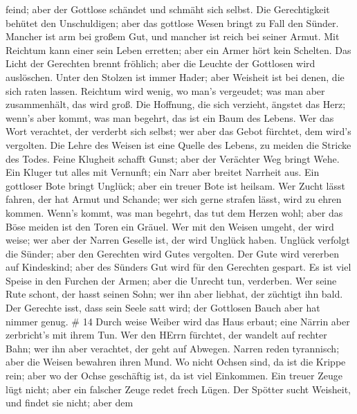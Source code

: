 feind; aber der Gottlose schändet und schmäht sich selbst. 
Die Gerechtigkeit behütet den Unschuldigen; aber das gottlose Wesen
bringt zu Fall den Sünder.  Mancher ist arm bei großem Gut,
und mancher ist reich bei seiner Armut.  Mit Reichtum kann
einer sein Leben erretten; aber ein Armer hört kein Schelten.
 Das Licht der Gerechten brennt fröhlich; aber die Leuchte
der Gottlosen wird auslöschen.  Unter den Stolzen ist immer
Hader; aber Weisheit ist bei denen, die sich raten lassen. 
Reichtum wird wenig, wo man's vergeudet; was man aber zusammenhält, das
wird groß.  Die Hoffnung, die sich verzieht, ängstet das
Herz; wenn's aber kommt, was man begehrt, das ist ein Baum des Lebens.
 Wer das Wort verachtet, der verderbt sich selbst; wer aber
das Gebot fürchtet, dem wird's vergolten.  Die Lehre des
Weisen ist eine Quelle des Lebens, zu meiden die Stricke des Todes.
 Feine Klugheit schafft Gunst; aber der Verächter Weg
bringt Wehe.  Ein Kluger tut alles mit Vernunft; ein Narr
aber breitet Narrheit aus.  Ein gottloser Bote bringt
Unglück; aber ein treuer Bote ist heilsam.  Wer Zucht lässt
fahren, der hat Armut und Schande; wer sich gerne strafen lässt, wird zu
ehren kommen.  Wenn's kommt, was man begehrt, das tut dem
Herzen wohl; aber das Böse meiden ist den Toren ein Gräuel.
 Wer mit den Weisen umgeht, der wird weise; wer aber der
Narren Geselle ist, der wird Unglück haben.  Unglück
verfolgt die Sünder; aber den Gerechten wird Gutes vergolten.
 Der Gute wird vererben auf Kindeskind; aber des Sünders
Gut wird für den Gerechten gespart.  Es ist viel Speise in
den Furchen der Armen; aber die Unrecht tun, verderben. 
Wer seine Rute schont, der hasst seinen Sohn; wer ihn aber liebhat, der
züchtigt ihn bald.  Der Gerechte isst, dass sein Seele satt
wird; der Gottlosen Bauch aber hat nimmer genug. \# 14 
Durch weise Weiber wird das Haus erbaut; eine Närrin aber zerbricht's
mit ihrem Tun.  Wer den HErrn fürchtet, der wandelt auf
rechter Bahn; wer ihn aber verachtet, der geht auf Abwegen. 
Narren reden tyrannisch; aber die Weisen bewahren ihren Mund.
 Wo nicht Ochsen sind, da ist die Krippe rein; aber wo der
Ochse geschäftig ist, da ist viel Einkommen.  Ein treuer
Zeuge lügt nicht; aber ein falscher Zeuge redet frech Lügen.
 Der Spötter sucht Weisheit, und findet sie nicht; aber dem
